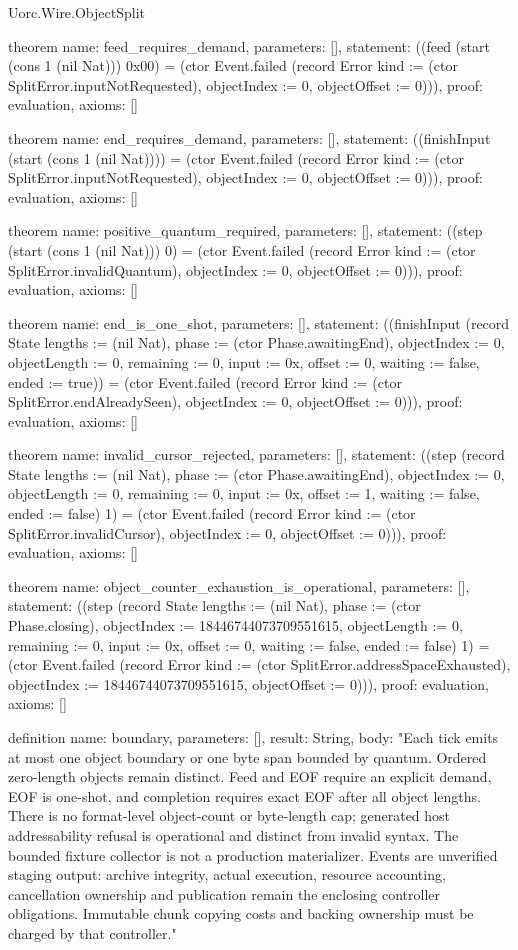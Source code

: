 \begin{lexlean}{Uorc.Wire.ObjectSplit}
\begin{semanticmodule}
theorem{
  name: feed_requires_demand,
  parameters: [],
  statement: ((feed (start (cons 1 (nil Nat))) 0x00) = (ctor Event.failed (record Error {kind := (ctor SplitError.inputNotRequested), objectIndex := 0, objectOffset := 0}))),
  proof: evaluation{},
  axioms: []
}

theorem{
  name: end_requires_demand,
  parameters: [],
  statement: ((finishInput (start (cons 1 (nil Nat)))) = (ctor Event.failed (record Error {kind := (ctor SplitError.inputNotRequested), objectIndex := 0, objectOffset := 0}))),
  proof: evaluation{},
  axioms: []
}

theorem{
  name: positive_quantum_required,
  parameters: [],
  statement: ((step (start (cons 1 (nil Nat))) 0) = (ctor Event.failed (record Error {kind := (ctor SplitError.invalidQuantum), objectIndex := 0, objectOffset := 0}))),
  proof: evaluation{},
  axioms: []
}

theorem{
  name: end_is_one_shot,
  parameters: [],
  statement: ((finishInput (record State {lengths := (nil Nat), phase := (ctor Phase.awaitingEnd), objectIndex := 0, objectLength := 0, remaining := 0, input := 0x, offset := 0, waiting := false, ended := true})) = (ctor Event.failed (record Error {kind := (ctor SplitError.endAlreadySeen), objectIndex := 0, objectOffset := 0}))),
  proof: evaluation{},
  axioms: []
}

theorem{
  name: invalid_cursor_rejected,
  parameters: [],
  statement: ((step (record State {lengths := (nil Nat), phase := (ctor Phase.awaitingEnd), objectIndex := 0, objectLength := 0, remaining := 0, input := 0x, offset := 1, waiting := false, ended := false}) 1) = (ctor Event.failed (record Error {kind := (ctor SplitError.invalidCursor), objectIndex := 0, objectOffset := 0}))),
  proof: evaluation{},
  axioms: []
}

theorem{
  name: object_counter_exhaustion_is_operational,
  parameters: [],
  statement: ((step (record State {lengths := (nil Nat), phase := (ctor Phase.closing), objectIndex := 18446744073709551615, objectLength := 0, remaining := 0, input := 0x, offset := 0, waiting := false, ended := false}) 1) = (ctor Event.failed (record Error {kind := (ctor SplitError.addressSpaceExhausted), objectIndex := 18446744073709551615, objectOffset := 0}))),
  proof: evaluation{},
  axioms: []
}

definition{
  name: boundary,
  parameters: [],
  result: String,
  body: "Each tick emits at most one object boundary or one byte span bounded by quantum. Ordered zero-length objects remain distinct. Feed and EOF require an explicit demand, EOF is one-shot, and completion requires exact EOF after all object lengths. There is no format-level object-count or byte-length cap; generated host addressability refusal is operational and distinct from invalid syntax. The bounded fixture collector is not a production materializer. Events are unverified staging output: archive integrity, actual execution, resource accounting, cancellation ownership and publication remain the enclosing controller obligations. Immutable chunk copying costs and backing ownership must be charged by that controller."
}


\end{semanticmodule}
\end{lexlean}
